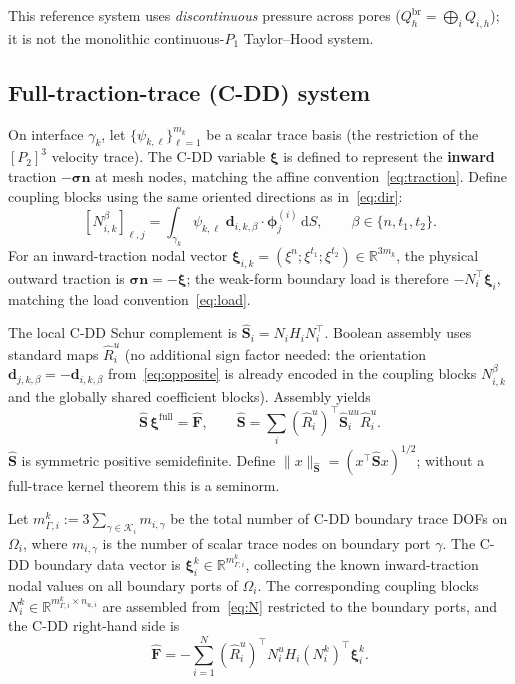 \documentclass[11pt,a4paper]{article}
\newcommand{\R}{\mathbb{R}}
\newcommand{\pore}[1]{\Omega_{#1}}
\newcommand{\iface}{\gamma}
\newcommand{\stress}{\bm{\sigma}}
\newcommand{\normal}{\bm{n}}
\newcommand{\Schur}{\mathbf{S}}
\begin{document}
This reference system uses \emph{discontinuous} pressure across pores
($Q_h^{\text{br}} = \bigoplus_i Q_{i,h}$); it is not the monolithic
continuous-$P_1$ Taylor--Hood system.

\subsection{Full-traction-trace (C-DD) system}

On interface $\iface_k$, let $\{\psi_{k,\ell}\}_{\ell=1}^{m_k}$ be a
scalar trace basis (the restriction of the $[P_2]^3$ velocity trace).
The C-DD variable $\bm{\xi}$ is defined to represent the \textbf{inward}
traction $-\stress\normal$ at mesh nodes, matching the affine
convention~\eqref{eq:traction}.
Define coupling blocks using the same oriented directions as
in~\eqref{eq:dir}:
\begin{equation}\label{eq:N}
  [N_{i,k}^{\beta}]_{\ell,j}
  = \int_{\iface_k} \psi_{k,\ell}\;
    \bm{d}_{i,k,\beta}\cdot\bm{\phi}_j^{(i)}\,\mathrm{d}S,
  \qquad \beta \in \{n,t_1,t_2\}.
\end{equation}
For an inward-traction nodal vector $\bm{\xi}_{i,k}
= (\xi^n;\xi^{t_1};\xi^{t_2}) \in \R^{3m_k}$, the physical outward
traction is $\stress\normal = -\bm{\xi}$; the weak-form boundary load
is therefore $-N_i^\top \bm{\xi}_i$, matching the load
convention~\eqref{eq:load}.

The local C-DD Schur complement is
$\widehat{\Schur}_i = N_i H_i N_i^\top$.
Boolean assembly uses standard maps $\widehat{R}_i^u$ (no additional
sign factor needed: the orientation $\bm{d}_{j,k,\beta}
= -\bm{d}_{i,k,\beta}$ from~\eqref{eq:opposite} is already encoded in
the coupling blocks $N_{i,k}^\beta$ and the globally shared coefficient
blocks).  Assembly yields
\begin{equation}\label{eq:cdd}
  \widehat{\Schur}\,\bm{\xi}^{\text{full}} = \widehat{\bm{F}},\qquad
  \widehat{\Schur} = \sum_i (\widehat{R}_i^u)^\top
    \widehat{\Schur}_i^{uu} \widehat{R}_i^u.
\end{equation}
$\widehat{\Schur}$ is symmetric positive semidefinite.
Define $\|x\|_{\widehat{\Schur}} = (x^\top\widehat{\Schur} x)^{1/2}$;
without a full-trace kernel theorem this is a seminorm.

Let $m_{\Gamma,i}^k := 3\sum_{\gamma\in\mathcal{K}_i} m_{i,\gamma}$
be the total number of C-DD boundary trace DOFs on $\pore{i}$,
where $m_{i,\gamma}$ is the number of scalar trace nodes on boundary
port $\gamma$.  The C-DD boundary data vector is
$\bm{\xi}_i^k \in \R^{m_{\Gamma,i}^k}$, collecting the known
inward-traction nodal values on all boundary ports of $\pore{i}$.
The corresponding coupling blocks $N_i^k \in \R^{m_{\Gamma,i}^k
\times n_{u,i}}$ are assembled from~\eqref{eq:N} restricted to
the boundary ports, and the C-DD right-hand side is
\begin{equation}\label{eq:cdd-F}
  \widehat{\bm{F}}
  = -\sum_{i=1}^N (\widehat{R}_i^u)^\top
    N_i^u H_i (N_i^k)^\top \bm{\xi}_i^k.
\end{equation}
\end{document}
